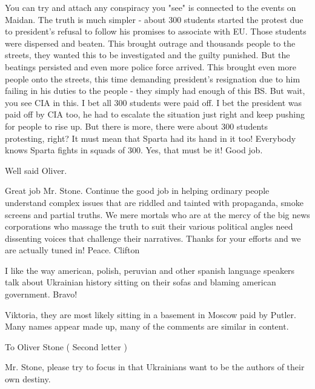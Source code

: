 \begin{itemize}

You can try and attach any conspiracy you "see" is connected to the events on
Maidan. The truth is much simpler - about 300 students started the protest due
to president's refusal to follow his promises to associate with EU. Those
students were dispersed and beaten. This brought outrage and thousands people
to the streets, they wanted this to be investigated and the guilty punished.
But the beatings persisted and even more police force arrived. This brought
even more people onto the streets, this time demanding president's resignation
due to him failing in his duties to the people - they simply had enough of this
BS. But wait, you see CIA in this. I bet all 300 students were paid off. I bet
the president was paid off by CIA too, he had to escalate the situation just
right and keep pushing for people to rise up. But there is more, there were
about 300 students protesting, right? It must mean that Sparta had its hand in
it too! Everybody knows Sparta fights in squads of 300. Yes, that must be it!
Good job.


Well said Oliver.


Great job Mr. Stone. Continue the good job in helping ordinary people
understand complex issues that are riddled and tainted with propaganda, smoke
screens and partial truths. We mere mortals who are at the mercy of the big
news corporations who massage the truth to suit their various political angles
need dissenting voices that challenge their narratives. Thanks for your efforts
and we are actually tuned in! Peace. Clifton



I like the way american, polish, peruvian and other spanish language speakers
talk about Ukrainian history sitting on their sofas and blaming american
government. Bravo!

\begin{itemize} %

Viktoria, they are most likely sitting in a basement in Moscow paid by Putler.
Many names appear made up, many of the comments are similar in content.

\end{itemize} %


To Oliver Stone ( Second letter )

Mr. Stone, please try to focus in that Ukrainians want to be the authors of
their own destiny.


\end{itemize}
